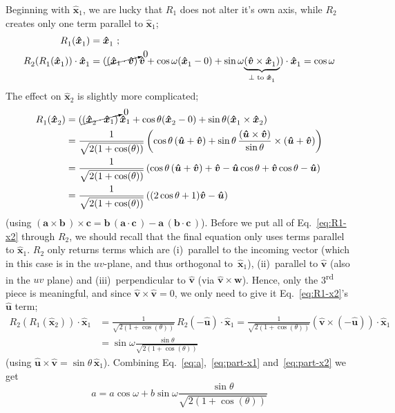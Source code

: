 \documentclass{article}
\renewcommand{\vec}[1]{\boldsymbol{#1}}
\newcommand{\vecN}[1]{\vec{\hat{#1}}}
\newcommand{\ds}{^{}}
\newcommand{\vict}{\vec{w}}
\newcommand{\ax}{\vecN{x}}
\newcommand{\super}[2]{#1\textsuperscript{#2}}
\begin{document}
Beginning with $\ax_1\ds$, we are lucky that 
$R_1\ds$ does not alter it's own axis, 
while $R_2\ds$ creates only one term parallel to $\ax_1\ds$;
\begin{align}\label{eq:part-x1}
	R_1\ds(\ax_1\ds) & = \ax_1\ds\,\,;\\
	R_2\ds(R_1\ds(\ax_1\ds))\cdot\ax_1\ds
	& = (\cancelto{0}{(\ax_1\cdot\vecN{v})}\,\vecN{v}
		+ \cos\omega(\ax_1\ds - 0) 
		+ \sin\omega\underset{\bot\text{ to }\ax_1\ds}{\underbrace
			{(\vecN{v}\times\ax_1\ds)}})\cdot\ax_1\ds = \cos\omega
\end{align}
The effect on $\ax_2\ds$ is slightly more complicated;
\begin{align}\label{eq:R1-x2}
	R_1\ds(\ax_2\ds) 
		& = (\cancelto{0}{(\ax_2\ds\cdot\ax_1)}\,\ax_1
		+ \cos\theta(\ax_2\ds - 0) + \sin\theta(\ax_1\ds\times\ax_2\ds)\nonumber\\
		& = \frac{1}{\sqrt{2(1+\cos(\theta))}}
		\left(\cos\theta\,(\vecN{u}+\vecN{v}) 
			+ \sin\theta\,\frac{(\vecN{u}\times\vecN{v})}{\sin\theta}\times(\vecN{u}+\vecN{v})\right)\nonumber\\
		& = \frac{1}{\sqrt{2(1+\cos(\theta))}}
		\left(\cos\theta\,(\vecN{u}+\vecN{v}) + 
		\vecN{v} - \vecN{u}\cos\theta + \vecN{v}\cos\theta - \vecN{u}\right)\nonumber\\
		& = \frac{1}{\sqrt{2(1+\cos(\theta))}}
		\left((2\cos\theta + 1)\vecN{v} - \vecN{u}\right)
\end{align}
(using ${(\vec{a}\times\vec{b}\,)\times\vec{c} 
	= \vec{b}\,(\vec{a}\cdot\vec{c}\,) - \vec{a}\,(\vec{b}\cdot\vec{c}\,)}$).
Before we put all of Eq.~\ref{eq:R1-x2} through $R_2\ds$, 
we should recall that the final equation only uses terms parallel to $\ax_1\ds$. 
$R_2\ds$ only returns terms which are 
(i)~parallel to the incoming vector 
(which in this case is in the $uv$-plane, and thus orthogonal to~$\ax_1\ds$), 
(ii)~parallel to $\vecN{v}$ (also in the $uv$ plane) and 
(iii)~perpendicular to $\vecN{v}$ (via $\vecN{v}\times\vict$).
Hence, only the \super{3}{rd} piece is meaningful, 
and since $\vecN{v}\times\vecN{v}=0$, 
we only need to give it Eq.~\ref{eq:R1-x2}'s $\vecN{u}$ term;
\begin{align}\label{eq:part-x2}
	R_2\ds(R_1\ds(\ax_2\ds))\cdot\ax_1\ds
		& = \frac{1}{\sqrt{2(1+\cos(\theta))}} \,R_2\ds(-\vecN{u})\cdot\ax_1\ds
		= \frac{1}{\sqrt{2(1+\cos(\theta))}} (\vecN{v}\times(-\vecN{u}))\cdot\ax_1\ds\nonumber\\
		& = \sin\omega\frac{\sin\theta}{\sqrt{2(1+\cos(\theta))}}
\end{align}
(using $\vecN{u}\times\vecN{v} = \sin\theta\,\ax_1\ds$).
Combining Eq.~\ref{eq:a},~\ref{eq:part-x1} and~\ref{eq:part-x2} we get
\begin{equation}
	a = a \cos\omega + b\sin\omega\frac{\sin\theta}{\sqrt{2(1+\cos(\theta))}}
\end{equation}
\end{document}
